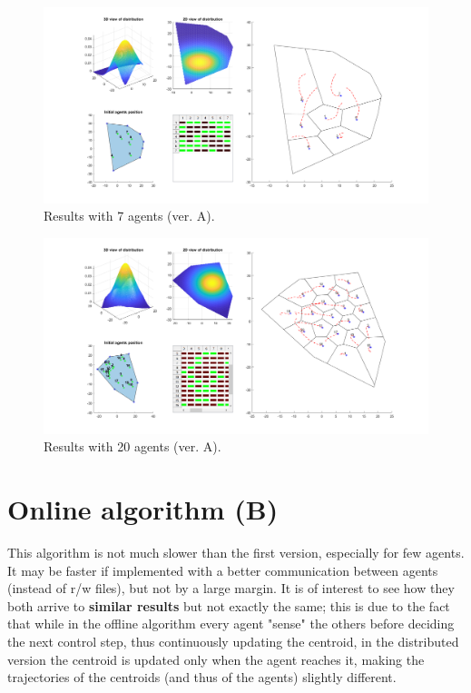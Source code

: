 \documentclass[a4paper,11pt,oneside]{book}
\begin{document}
	
	\begin{figure}	
		\centering	
		\includegraphics[scale=0.45,angle=90]{figs/convergenceResultsA.png}
		\caption{Results with 7 agents (ver. A).}\label{fig:convergenceResultsA.png}	
	\end{figure}
	
	\begin{figure}	
		\centering	
		\includegraphics[scale=0.45, angle=90]{figs/20convergenceResultsA.png}
		\caption{Results with 20 agents (ver. A).}\label{fig:20convergenceResultsA.png}	
	\end{figure}
	
	\section{Online algorithm (B)}
	This algorithm is not much slower than the first version, especially for few agents.
	It may be faster if implemented with a better communication between agents (instead of r/w files), but not by a large margin.
	It is of interest to see how they both arrive to \textbf{similar results} but not exactly the same; this is due to the fact that while in the offline algorithm every agent "sense" the others before deciding the next control step, thus continuously updating the centroid, in the distributed version the centroid is updated only when the agent reaches it, making the trajectories of the centroids (and thus of the agents) slightly different.
	
\end{document}
